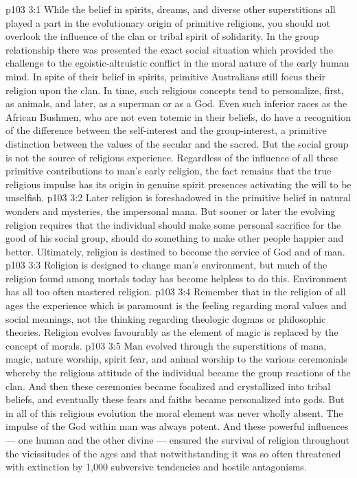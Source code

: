 \vs p103 3:1 While the belief in spirits, dreams, and diverse other superstitions all played a part in the evolutionary origin of primitive religions, you should not overlook the influence of the clan or tribal spirit of solidarity. In the group relationship there was presented the exact social situation which provided the challenge to the egoistic\hyp{}altruistic conflict in the moral nature of the early human mind. In spite of their belief in spirits, primitive Australians still focus their religion upon the clan. In time, such religious concepts tend to personalize, first, as animals, and later, as a superman or as a God. Even such inferior races as the African Bushmen, who are not even totemic in their beliefs, do have a recognition of the difference between the self\hyp{}interest and the group\hyp{}interest, a primitive distinction between the values of the secular and the sacred. But the social group is not the source of religious experience. Regardless of the influence of all these primitive contributions to man’s early religion, the fact remains that the true religious impulse has its origin in genuine spirit presences activating the will to be unselfish.
\vs p103 3:2 \pc Later religion is foreshadowed in the primitive belief in natural wonders and mysteries, the impersonal mana. But sooner or later the evolving religion requires that the individual should make some personal sacrifice for the good of his social group, should do something to make other people happier and better. Ultimately, religion is destined to become the service of God and of man.
\vs p103 3:3 Religion is designed to change man’s environment, but much of the religion found among mortals today has become helpless to do this. Environment has all too often mastered religion.
\vs p103 3:4 \pc Remember that in the religion of all ages the experience which is paramount is the feeling regarding moral values and social meanings, not the thinking regarding theologic dogmas or philosophic theories. Religion evolves favourably as the element of magic is replaced by the concept of morals.
\vs p103 3:5 Man evolved through the superstitions of mana, magic, nature worship, spirit fear, and animal worship to the various ceremonials whereby the religious attitude of the individual became the group reactions of the clan. And then these ceremonies became focalized and crystallized into tribal beliefs, and eventually these fears and faiths became personalized into gods. But in all of this religious evolution the moral element was never wholly absent. The impulse of the God within man was always potent. And these powerful influences --- one human and the other divine --- ensured the survival of religion throughout the vicissitudes of the ages and that notwithstanding it was so often threatened with extinction by 1,000 subversive tendencies and hostile antagonisms.
